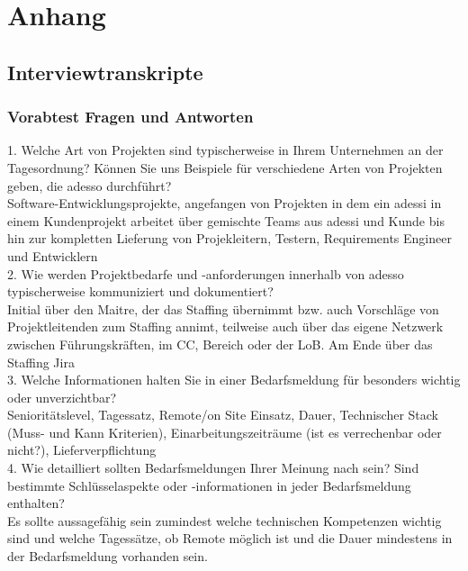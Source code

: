 \chapter{Anhang}
\label{chap:ergebnisse}
\section{Interviewtranskripte}
\subsection{Vorabtest Fragen und Antworten}
\label{interview1}
1. Welche Art von Projekten sind typischerweise in Ihrem Unternehmen an der Tagesordnung? Können Sie uns Beispiele für verschiedene Arten von Projekten geben, die adesso durchführt?\\

Software-Entwicklungsprojekte, angefangen von Projekten in dem ein adessi in einem Kundenprojekt arbeitet über gemischte Teams aus adessi und Kunde bis hin zur kompletten Lieferung von Projekleitern, Testern, Requirements Engineer und Entwicklern\\

2. Wie werden Projektbedarfe und -anforderungen innerhalb von adesso typischerweise kommuniziert und dokumentiert?\\

Initial über den Maitre, der das Staffing übernimmt bzw. auch Vorschläge von Projektleitenden zum Staffing annimt, teilweise auch über das eigene Netzwerk zwischen Führungskräften, im CC, Bereich oder der LoB. Am Ende über das Staffing Jira\\

3. Welche Informationen halten Sie in einer Bedarfsmeldung für besonders wichtig oder unverzichtbar?\\

Senioritätslevel, Tagessatz, Remote/on Site Einsatz, Dauer, Technischer Stack (Muss- und Kann Kriterien), Einarbeitungszeiträume (ist es verrechenbar oder nicht?), Lieferverpflichtung\\

4. Wie detailliert sollten Bedarfsmeldungen Ihrer Meinung nach sein? Sind bestimmte Schlüsselaspekte oder -informationen in jeder Bedarfsmeldung enthalten?\\

Es sollte aussagefähig sein zumindest welche technischen Kompetenzen wichtig sind und welche Tagessätze, ob Remote möglich ist und die Dauer mindestens in der Bedarfsmeldung vorhanden sein.\\ 

